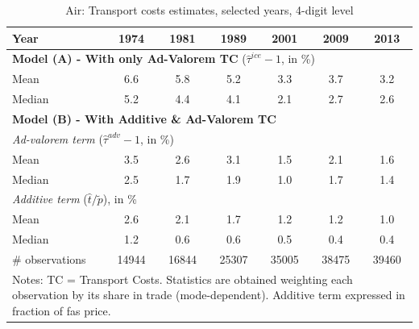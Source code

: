 \documentclass[11pt,twoside, authoryear]{elsarticle}
\begin{document}
\begin{table}[htbp]
  \centering
  \caption{Air: Transport costs estimates, selected years, 4-digit level}
\begin{center}
  \footnotesize{
    \begin{tabular}{l|cccccc}
   \hline\hline
Year & 1974  & 1981  & 1989  & 2001  & 2009  & 2013 \\ \hline
\multicolumn{7}{l}{\textbf{Model (A) - With only Ad-Valorem TC} ($\widehat{\tau}^{ice}-1$, in \%) }  \\
\hline
Mean  & 6.6 & 5.8 & 5.2 & 3.3 & 3.7 & 3.2 \\
Median & 5.2 & 4.4 & 4.1 & 2.1 & 2.7 & 2.6 \\
\hline
\multicolumn{7}{l}{\textbf{Model (B) - With Additive \& Ad-Valorem TC}}  \\ \hline
\multicolumn{7}{l}{\textit{Ad-valorem term }($\widehat{\tau}^{adv}-1$, in \%) }   \\ \hline
Mean  & 3.5 & 2.6 & 3.1 & 1.5 & 2.1 & 1.6  \\
Median & 2.5 & 1.7 & 1.9 & 1.0 & 1.7 & 1.4  \\
\hline
\multicolumn{7}{l}{\textit{Additive term} ($\widehat{t}/\widetilde{p}$), in \%}    \\ \hline
Mean  & 2.6 & 2.1 & 1.7 & 1.2 &1.2 & 1.0 \\
Median & 1.2 & 0.6 & 0.6 & 0.5 & 0.4 & 0.4  \\
\hline
\# observations & 14944 & 16844 & 25307 & \multicolumn{1}{c}{35005} & \multicolumn{1}{c}{38475} & \multicolumn{1}{c}{39460}  \\
\hline\hline
\multicolumn{7}{l}{\parbox[l]{10cm}{ \vspace{7pt}\scriptsize{Notes: TC = Transport Costs.
Statistics are obtained weighting each observation by its share in trade (mode-dependent).
Additive term expressed in fraction of fas price.}}}
\end{tabular}%
}
\end{center}
  \label{tab:result_air_rob}
\end{table}%
\end{document}
